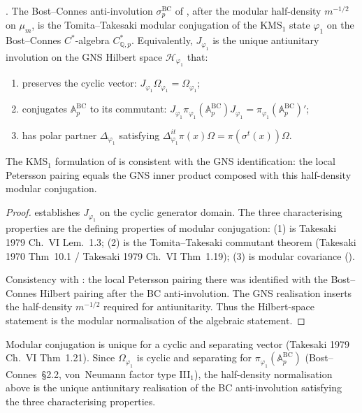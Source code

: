 \begin{theorem}
\label{v4-arith:kms-gns:thm:KMS1-GNS-BC-identification}
\ClaimStatusProvedHere. The Bost--Connes anti-involution
\(\sigma^{\mathrm{BC}}_{p}\) of
, after the modular
half-density \(m^{-1/2}\) on \(\mu_m\), is the Tomita--Takesaki
modular conjugation of the KMS\({}_{1}\) state \(\varphi_{1}\) on the
Bost--Connes \(C^{*}\)-algebra \(C^{*}_{\mathbb{Q},p}\). Equivalently,
\(J_{\varphi_{1}}\) is the unique antiunitary involution on the GNS
Hilbert space \(\mathcal{H}_{\varphi_{1}}\) that:
\begin{enumerate}
\item preserves the cyclic vector: \(J_{\varphi_{1}}\Omega_{\varphi_{1}}=\Omega_{\varphi_{1}}\);
\item conjugates \(\mathbb{A}^{\mathrm{BC}}_{p}\) to its commutant:
\(J_{\varphi_{1}}\pi_{\varphi_{1}}(\mathbb{A}^{\mathrm{BC}}_{p})J_{\varphi_{1}}=\pi_{\varphi_{1}}(\mathbb{A}^{\mathrm{BC}}_{p})'\);
\item has polar partner \(\Delta_{\varphi_{1}}\) satisfying
\(\Delta_{\varphi_{1}}^{it}\pi(x)\Omega=\pi(\sigma^{t}(x))\Omega\).
\end{enumerate}
The KMS\({}_{1}\) formulation of
 is consistent with the
GNS identification: the local Petersson pairing equals the GNS inner
product composed with this half-density modular conjugation.
\end{theorem}

\begin{proof}
 establishes
\(J_{\varphi_{1}}\) on the cyclic generator domain. The three
characterising properties are the defining properties of modular
conjugation: (1) is Takesaki 1979 Ch.~VI Lem.~1.3; (2) is the
Tomita--Takesaki commutant theorem (Takesaki 1970 Thm~10.1 /
Takesaki 1979 Ch.~VI Thm~1.19); (3) is modular covariance
().

Consistency with
: the local Petersson
pairing there was identified with the Bost--Connes Hilbert pairing
after the BC anti-involution.  The GNS realisation inserts the
half-density \(m^{-1/2}\) required for antiunitarity. Thus the
Hilbert-space statement is the modular normalisation of the algebraic
statement.
\end{proof}

\begin{remark}[uniqueness]
\label{v4-arith:kms-gns:rem:uniqueness}
Modular conjugation is unique for a cyclic and separating vector
(Takesaki 1979 Ch.~VI Thm~1.21). Since \(\Omega_{\varphi_{1}}\) is cyclic
and separating for \(\pi_{\varphi_{1}}(\mathbb{A}^{\mathrm{BC}}_{p})\)
(Bost--Connes~\S2.2, von~Neumann factor type III\({}_{1}\)), the
half-density normalisation above is the unique antiunitary
realisation of the BC anti-involution satisfying the three
characterising properties.
\end{remark}

